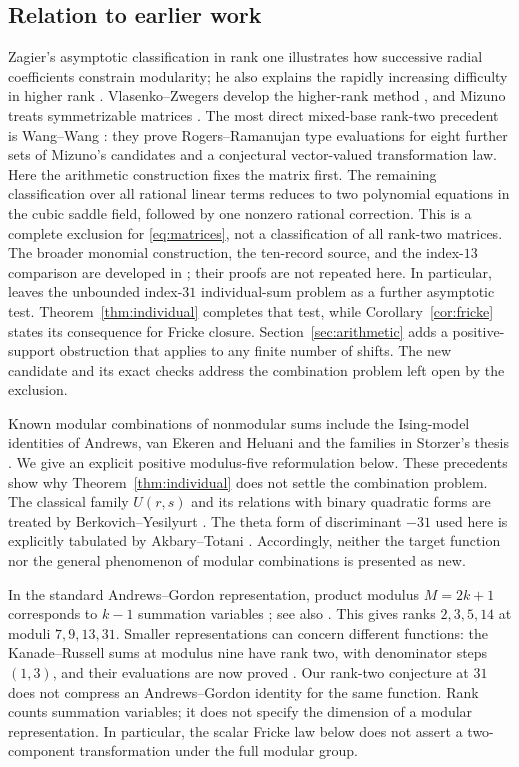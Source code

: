 \documentclass[11pt,reqno]{amsart}
\theoremstyle{remark}
\numberwithin{equation}{section}
\begin{document}
\subsection{Relation to earlier work}
Zagier's asymptotic classification in rank one illustrates how
successive radial coefficients constrain modularity; he also explains
the rapidly increasing difficulty in higher rank
\cite[Section~II.3.C]{Zagier}. Vlasenko--Zwegers develop the higher-rank
method \cite{VZ}, and Mizuno treats symmetrizable matrices \cite{Mizuno}.
The most direct mixed-base rank-two precedent is Wang--Wang
\cite{WW}: they prove Rogers--Ramanujan type evaluations for eight
further sets of Mizuno's candidates and a conjectural vector-valued
transformation law.
Here the arithmetic construction fixes the matrix first. The remaining
classification over all rational linear terms reduces to two polynomial
equations in the cubic saddle field, followed by one nonzero rational
correction. This is a complete exclusion for \eqref{eq:matrices}, not
a classification of all rank-two matrices.
The broader monomial construction, the ten-record source, and the
index-$13$ comparison are developed in \cite{Brown}; their proofs are
not repeated here. In particular, \cite[version~1, Section~5.3]{Brown}
leaves the unbounded index-$31$ individual-sum problem as a further
asymptotic test. Theorem~\ref{thm:individual} completes that test, while
Corollary~\ref{cor:fricke} states its consequence for Fricke closure.
Section~\ref{sec:arithmetic} adds a positive-support obstruction that
applies to any finite number of shifts. The new candidate and its exact
checks address the combination problem left open by the exclusion.

Known modular combinations of nonmodular sums include the Ising-model
identities of Andrews, van Ekeren and Heluani \cite{AVH} and the families
in Storzer's thesis \cite[Section~6.3]{Storzer}. We give an explicit
positive modulus-five reformulation below. These precedents show why
Theorem~\ref{thm:individual} does not settle the combination problem.
The classical family $U(r,s)$ and its relations with binary quadratic
forms are treated by Berkovich--Yesilyurt \cite{BY}. The theta form of
discriminant $-31$ used here is explicitly tabulated by Akbary--Totani
\cite{AT}. Accordingly, neither the target function nor the general
phenomenon of modular combinations is presented as new.

In the standard Andrews--Gordon representation, product modulus
$M=2k+1$ corresponds to $k-1$ summation variables \cite{Andrews}; see also
\cite[(1.2)]{Warnaar}.
This gives ranks $2,3,5,14$ at moduli $7,9,13,31$. Smaller representations
can concern different functions: the Kanade--Russell sums at modulus
nine have rank two, with denominator steps $(1,3)$, and their evaluations
are now proved \cite{MizunoKR,Xia}. Our rank-two conjecture at $31$
does not compress an Andrews--Gordon identity for the same function.
Rank counts summation variables; it does not specify the dimension of
a modular representation. In particular, the scalar Fricke law below
does not assert a two-component transformation under the full modular group.
\end{document}
